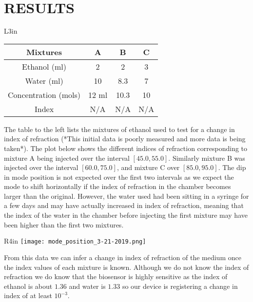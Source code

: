 \documentclass{article}
\begin{document}
\section*{RESULTS}

\begin{wrapfigure}{L}{3in}
\begin{tabular}{| c c c c |}
	\toprule
	Mixtures      	     &  A    & B    &  C \\
	\midrule
	Ethanol (ml)  	 	 &  2    & 2    &  3 \\
	Water   (ml)  	 	 & 10    & 8.3  &  7 \\
	Concentration (mols) & 12 ml & 10.3 & 10 \\
   	Index         		 & N/A   & N/A  & N/A \\
	\bottomrule
\end{tabular}
\end{wrapfigure}
The table to the left lists the mixtures of ethanol used to test for a change in index of refraction (*This initial data is poorly measured and more data is being taken*). The plot below shows the different indices of refraction corresponding to mixture A being injected over the interval $[45.0, 55.0]$. Similarly mixture B was injected over the interval $[60.0, 75.0]$, and mixture C over $[85.0, 95.0]$. The dip in mode position is not expected over the first two intervals as we expect the mode to shift horizontally if the index of refraction in the chamber becomes larger than the original. However, the water used had been sitting in a syringe for a few days and may have actually increased in index of refraction, meaning that the index of the water in the chamber before injecting the first mixture may have been higher than the first two mixtures.
\begin{wrapfigure}{R}{4in}
	\texttt{[image: mode\_position\_3-21-2019.png]}
\end{wrapfigure}

From this data we can infer a change in index of refraction of the medium once the index values of each mixture is known. Although we do not know the index of refraction we do know that the biosensor is highly sensitive as the index of ethanol is about $1.36$ and water is $1.33$ so our device is registering a change in index of at least $10^{-3}$.
\end{document}
